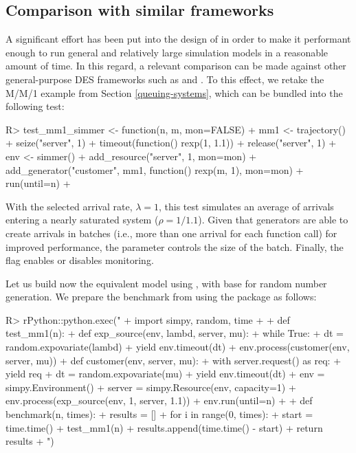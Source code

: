 \documentclass[
  nojss]{jss}
\begin{document}
\hypertarget{comparison-with-similar-frameworks}{%
\subsection{Comparison with similar
frameworks}\label{comparison-with-similar-frameworks}}

A significant effort has been put into the design of  in
order to make it performant enough to run general and relatively large
simulation models in a reasonable amount of time. In this regard, a
relevant comparison can be made against other general-purpose DES
frameworks such as  and . To this effect, we
retake the M/M/1 example from Section \ref{queuing-systems}, which can
be bundled into the following test:

\begin{CodeChunk}
\begin{CodeInput}
R> test_mm1_simmer <- function(n, m, mon=FALSE) {
+   mm1 <- trajectory() %
+     seize("server", 1) %
+     timeout(function() rexp(1, 1.1)) %
+     release("server", 1)
+   env <- simmer() %
+     add_resource("server", 1, mon=mon) %
+     add_generator("customer", mm1, function() rexp(m, 1), mon=mon) %
+     run(until=n)
+ }
\end{CodeInput}
\end{CodeChunk}

With the selected arrival rate, \(\lambda=1\), this test simulates an
average of  arrivals entering a nearly saturated system
(\(\rho=1/1.1\)). Given that  generators are able to create
arrivals in batches (i.e., more than one arrival for each function call)
for improved performance, the parameter  controls the size of
the batch. Finally, the  flag enables or disables monitoring.

Let us build now the equivalent model using , with base
 for random number generation. We prepare the
 benchmark from  using the 
package \citep{CRAN:rPython} as follows:

\begin{CodeChunk}
\begin{CodeInput}
R> rPython::python.exec("
+ import simpy, random, time
+ 
+ def test_mm1(n):
+   def exp_source(env, lambd, server, mu):
+       while True:
+           dt = random.expovariate(lambd)
+           yield env.timeout(dt)
+           env.process(customer(env, server, mu))
+   def customer(env, server, mu):
+       with server.request() as req:
+           yield req
+           dt = random.expovariate(mu)
+           yield env.timeout(dt)
+   env = simpy.Environment()
+   server = simpy.Resource(env, capacity=1)
+   env.process(exp_source(env, 1, server, 1.1))
+   env.run(until=n)
+ 
+ def benchmark(n, times):
+   results = []
+   for i in range(0, times):
+     start = time.time()
+     test_mm1(n)
+     results.append(time.time() - start)
+   return results
+ ")
\end{CodeInput}
\end{CodeChunk}
\end{document}
